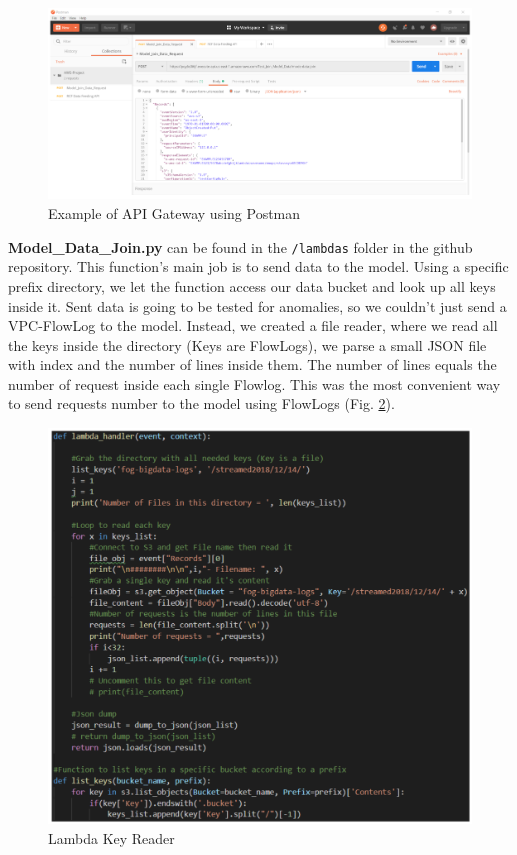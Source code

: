 \begin{figure}[h!]
    \includegraphics[width=1\textwidth]{images/api-gateway.png}
    \caption{Example of API Gateway using Postman}
    \label{fig:api_gateway}
\end{figure}

\textbf{Model\_Data\_Join.py} can be found in the \verb|/lambdas| folder in the github repository.
This function's main job is to send data to the model. Using a specific prefix directory, we let the function access our data bucket and look up all keys inside it. Sent data is going to be tested for anomalies, so we couldn't just send a VPC-FlowLog to the model. Instead, we created a file reader, where we read all the keys inside the directory (Keys are FlowLogs), we parse a small JSON file with index and the number of lines inside them. The number of lines equals the number of request inside each single Flowlog. This was the most convenient way to send requests number to the model using FlowLogs (Fig. \ref{fig:lambda_key_reader}).

\begin{figure}[h!]
    \centering
    \includegraphics[width=1\textwidth]{images/lambda-key-reader.png}
    \caption{Lambda Key Reader}
    \label{fig:lambda_key_reader}
\end{figure}

